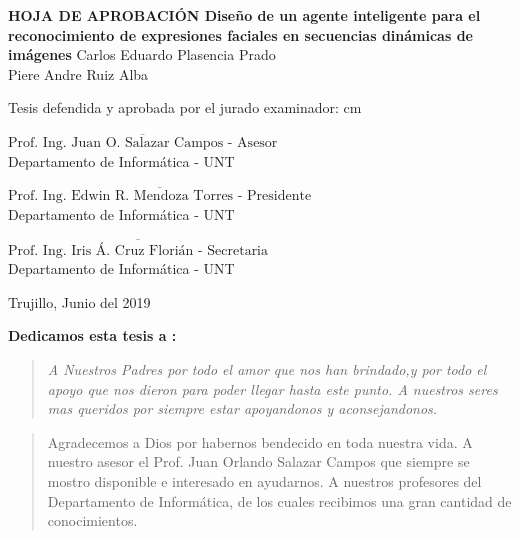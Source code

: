 \begin{center}
 {\bf {\Large HOJA DE APROBACIÓN }     
 \vskip 1.5cm
  {\Large Diseño de un agente inteligente para el reconocimiento de expresiones faciales en secuencias dinámicas de imágenes}}
 \vskip 1cm 
  {\large{Carlos Eduardo Plasencia Prado}}\\
    {\large{Piere Andre Ruiz Alba}}

 \vskip 1cm
\end{center} 
Tesis defendida y aprobada por el jurado examinador:
 cm
\begin{flushleft} 
$\overline{\mbox{Prof. Ing. Juan O. Salazar Campos - Asesor}}$\\
\vskip -0.5cm
Departamento de Informática - UNT
\end{flushleft} 
\vskip 0.8cm
\begin{flushleft} 
$\overline{\mbox{Prof. Ing. Edwin R. Mendoza Torres - Presidente}}$\\
\vskip -0.5cm
Departamento de Informática - UNT
\end{flushleft} 
\vskip 0.8cm
\begin{flushleft} 
$\overline{\mbox{Prof. Ing. Iris Á. Cruz Florián - Secretaria}}$\\
\vskip -0.5cm
Departamento de Informática - UNT
\end{flushleft}
\vskip 0.5cm 
\begin{center}    
Trujillo, Junio del 2019
\end{center} 
\newpage


 
 {\bf\Large {Dedicamos esta tesis a :}}
 \vskip 1cm
\begin{quotation}
{\it A Nuestros Padres por todo el amor que nos han brindado,y por todo el apoyo que nos dieron para poder llegar hasta este punto.
\vskip 1cm
A nuestros seres mas queridos por siempre estar apoyandonos y aconsejandonos.
}
\end{quotation}


\newpage

 {\bf\Large {}}
 \vskip 1.5cm
\begin{quotation}
Agradecemos a Dios por habernos bendecido en toda nuestra vida.
{\vskip 1cm}
A nuestro asesor el Prof. Juan Orlando Salazar Campos que siempre se mostro disponible e interesado en ayudarnos.
\vskip 1cm
A nuestros profesores del Departamento de Informática, de los cuales recibimos una gran cantidad de conocimientos.
\vskip 1cm
 \end{quotation}


